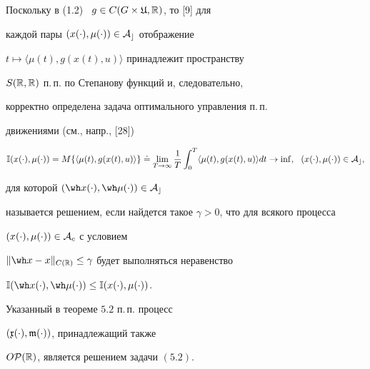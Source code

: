 






Поскольку в (1.2) \ $g\in C(G\times\frak U,\Bbb R)$, то [9] для 


каждой пары $(x(\cdot),\mu(\cdot))\in\cal A_c$ отображение


$t\mapsto\langle\mu(t),g(x(t),u)\rangle$ принадлежит пространству


$S(\Bbb R,\Bbb R)$ п.\,п. по Степанову функций и, следовательно,


корректно определена задача оптимального управления п.\,п.


движениями (см., напр., [28])


\begin{equation}


\Bbb I(x(\cdot),\mu(\cdot))=M\{\langle\mu(t),g(x(t),u)\rangle\}\doteq


\lim_{T\to\infty}\frac{1}{T}


\int_0^T\langle\mu(t),g(x(t),u)\rangle dt\to\inf,


\ \ (x(\cdot),\mu(\cdot))\in\cal A_c,


\end{equation}


для которой $(\wh x(\cdot),\wh\mu(\cdot))\in\cal A_c$


называется решением, если найдется такое $\gamma>0$, что для всякого процесса


$(x(\cdot),\mu(\cdot))\in{\cal A}_c$ с условием


$\|\wh x-x\|_{C(\Bbb R)}\le\gamma$ будет выполняться неравенство


$\Bbb I(\wh x(\cdot),\wh\mu(\cdot))\le\Bbb I(x(\cdot),\mu(\cdot))$.








\begin{thms}


Указанный в теореме $5.2$ п.\,п. процесс


$(\frak x(\cdot),\frak m(\cdot))$, принадлежащий также


$O\cal P(\Bbb R)$, является решением задачи $(5.2)$.


\end{thms}









